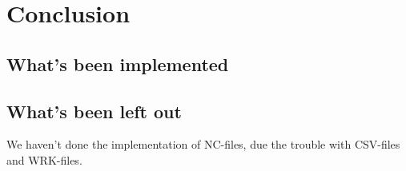 \chapter{Conclusion}
\section{What's been implemented}

\section{What's been left out}
We haven't done the implementation of NC-files, due the trouble with CSV-files and WRK-files.